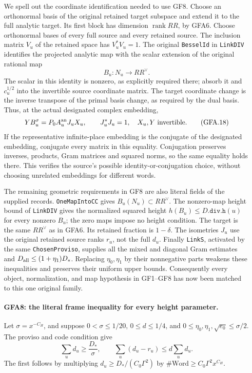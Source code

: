 We spell out the coordinate identification needed to use GF8.
Choose an orthonormal basis of the original retained target
subspace and extend it to the full analytic target.  Its first
block has dimension $\operatorname{rank}RR$, by GFA6.
Choose orthonormal bases of every full source and every retained
source.  The inclusion matrix $V_u$ of the retained space has
$V_u^*V_u=1$.  The original \texttt{BesselId} in
\texttt{LinkDIV} identifies the projected analytic map with the
scalar extension of the original rational map
\[
 B_u:N_u\longrightarrow RR^\vee.
\]
The scalar in this identity is nonzero, as explicitly required
there; absorb it and $c_u^{1/2}$ into the invertible source
coordinate matrix.  The target coordinate change is the inverse
transpose of the primal basis change, as required by the dual
basis.  Thus, at the actual designated complex embedding,
\[
 YB_u^\sigma=P_0 A_u^{\rm an}J_uX_u,
 \qquad J_u^*J_u=1,\quad X_u,Y\text{ invertible}.             \tag{GFA.18}
\]
If the representative infinite-place embedding is the conjugate
of the designated embedding, conjugate every matrix in this
equality.  Conjugation preserves inverses, products, Gram
matrices and squared norms, so the same equality holds there.
This verifies the source's possible identity-or-conjugation
choice, without choosing unrelated embeddings for different
words.

The remaining geometric requirements in GF8 are also literal
fields of the supplied records.  \texttt{OneMapIntoCC} gives
$B_u(N_u)\subset RR^\vee$.  The nonzero-map height bound of
\texttt{LinkDIV} gives the normalized squared height
$h(B_u)\le D.\texttt{div.h}(u)$ for every nonzero $B_u$;
the zero maps impose no height condition.  The target is the
same $RR^\vee$ as in GFA6.  Its retained fraction is
$1-\delta$.  The isometries $J_u$ use the original retained
source ranks $r_u$, not the full $d_u$.  Finally
\texttt{LinkS}, activated by the same \texttt{ChosenProviso},
supplies all the mixed and diagonal Gram estimates and
$D_{\rm all}\le(1+\eta_1)D_*$.
Replacing $\eta_0,\eta_1$ by their nonnegative parts weakens
these inequalities and preserves their uniform upper bounds.
Consequently every object, normalization, and map hypothesis
in GF1--GF8 has now been matched to this one original family.

\paragraph{GFA8: the literal frame inequality for every height parameter.}
\label{claim:GFA8}
Let $\sigma=x^{-C_H}$, and suppose $0<\sigma\le1/20$,
$0\le d\le1/4$, and
$0\le\eta_0,\eta_1,\sqrt{e_0}\le\sigma/2$.
The proviso and code condition give
\[
 \sum_ud_u\ge\frac{D_*}{\sigma},
 \qquad \sum_u(d_u-r_u)\le d\sum_ud_u.                       \tag{GFA.19}
\]
The first follows by multiplying
$d_u\ge D_*/(C_0\Gamma^2)$ by
$\#\mathrm{Word}\ge C_0\Gamma^2x^{C_H}$.

